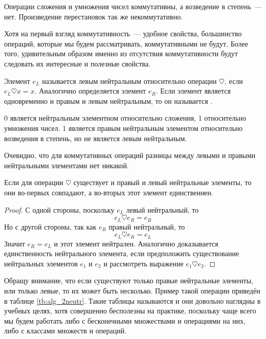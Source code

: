 \begin{example}
Операции сложения и умножения чисел коммутативны, а возведение в степень~--- нет. Произведение перестановок так же некоммутативно.
\end{example}

Хотя на первый взгляд коммутативность~--- удобное свойства, большинство операций, которые мы будем рассматривать, коммутативными не будут. Более того, удивительным образом именно из отсутствия коммутативности будут следовать их интересные и полезные свойства.

\begin{definition}
Элемент $e_L$ называется левым нейтральным относительно операции $\heartsuit$, если $e_L\heartsuit x = x$. Аналогично определяется  элемент $e_R$. Если элемент является одновременно и правым и левым нейтральным, то он называется .
\end{definition}

\begin{example}
0 является нейтральным элементном относительно сложения, 1 относительно умножения чисел. 1 является правым нейтральным элементом относительно возведения в степень, но не является левым нейтральным.
\end{example}

Очевидно, что для коммутативных операций разницы между левыми и правыми нейтральными элементами нет никакой.

\begin{thm}
Если для операции $\heartsuit$ существует и правый и левый нейтральные элементы, то они во-первых совпадают, а во-вторых этот элемент единственнен.
\end{thm}
\begin{proof}
С одной стороны, поскольку $e_L$ левый нейтральный, то
$$e_L\heartsuit e_R = e_R$$
Но с другой стороны, так как $e_R$ правый нейтральный, то
$$e_L\heartsuit e_R = e_L$$
Значит $e_R=e_L$ и этот элемент нейтрален. Аналогично доказывается единственность нейтрального элемента, если предположить существование нейтральных элементов $e_1$ и $e_2$ и рассмотреть выражение $e_1\heartsuit e_2$. 
\end{proof}

Обращу внимание, что если существуют только правые нейтральные элементы, или только левые, то их может быть несколько. Пример такой операции приведён в таблице \ref{tb:alg_2neutr}. Такие таблицы называются  и они довольно наглядны в учебных целях, хотя совершенно бесполезны на практике, поскольку чаще всего мы будем работать либо с бесконечными множествами и операциями на них, либо с классами множеств и операций.

